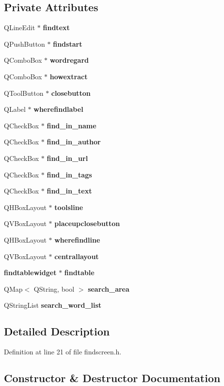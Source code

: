 \subsection*{Private Attributes}
\begin{CompactItemize}
\item 
QLine\-Edit $\ast$ {\bf findtext}
\item 
QPush\-Button $\ast$ {\bf findstart}
\item 
QCombo\-Box $\ast$ {\bf wordregard}
\item 
QCombo\-Box $\ast$ {\bf howextract}
\item 
QTool\-Button $\ast$ {\bf closebutton}
\item 
QLabel $\ast$ {\bf wherefindlabel}
\item 
QCheck\-Box $\ast$ {\bf find\_\-in\_\-name}
\item 
QCheck\-Box $\ast$ {\bf find\_\-in\_\-author}
\item 
QCheck\-Box $\ast$ {\bf find\_\-in\_\-url}
\item 
QCheck\-Box $\ast$ {\bf find\_\-in\_\-tags}
\item 
QCheck\-Box $\ast$ {\bf find\_\-in\_\-text}
\item 
QHBox\-Layout $\ast$ {\bf toolsline}
\item 
QVBox\-Layout $\ast$ {\bf placeupclosebutton}
\item 
QHBox\-Layout $\ast$ {\bf wherefindline}
\item 
QVBox\-Layout $\ast$ {\bf centrallayout}
\item 
{\bf findtablewidget} $\ast$ {\bf findtable}
\item 
QMap$<$ QString, bool $>$ {\bf search\_\-area}
\item 
QString\-List {\bf search\_\-word\_\-list}
\end{CompactItemize}


\subsection{Detailed Description}




Definition at line 21 of file findscreen.h.

\subsection{Constructor \& Destructor Documentation}
